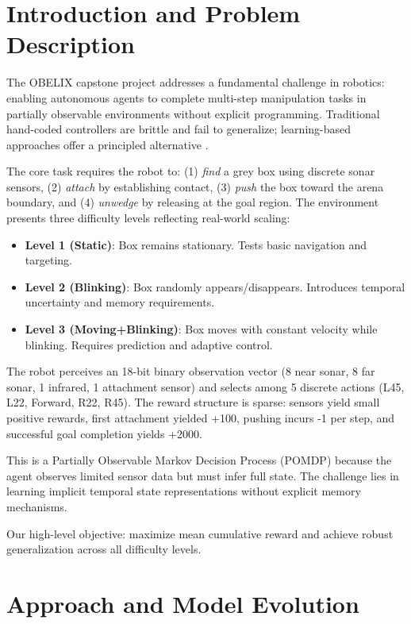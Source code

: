 \documentclass[12pt,a4paper]{article}
\begin{document}
\section{Introduction and Problem Description}

The OBELIX capstone project addresses a fundamental challenge in robotics: enabling autonomous agents to complete multi-step manipulation tasks in partially observable environments without explicit programming. Traditional hand-coded controllers are brittle and fail to generalize; learning-based approaches offer a principled alternative \cite{mahadevan1992automatic}.

The core task requires the robot to: (1) \textit{find} a grey box using discrete sonar sensors, (2) \textit{attach} by establishing contact, (3) \textit{push} the box toward the arena boundary, and (4) \textit{unwedge} by releasing at the goal region. The environment presents three difficulty levels reflecting real-world scaling:

\begin{itemize}
    \item \textbf{Level 1 (Static)}: Box remains stationary. Tests basic navigation and targeting.
    \item \textbf{Level 2 (Blinking)}: Box randomly appears/disappears. Introduces temporal uncertainty and memory requirements.
    \item \textbf{Level 3 (Moving+Blinking)}: Box moves with constant velocity while blinking. Requires prediction and adaptive control.
\end{itemize}

The robot perceives an 18-bit binary observation vector (8 near sonar, 8 far sonar, 1 infrared, 1 attachment sensor) and selects among 5 discrete actions (L45, L22, Forward, R22, R45). The reward structure is sparse: sensors yield small positive rewards, first attachment yielded +100, pushing incurs -1 per step, and successful goal completion yields +2000.

This is a Partially Observable Markov Decision Process (POMDP) because the agent observes limited sensor data but must infer full state. The challenge lies in learning implicit temporal state representations without explicit memory mechanisms.

Our high-level objective: maximize mean cumulative reward and achieve robust generalization across all difficulty levels.

\section{Approach and Model Evolution}
\end{document}
